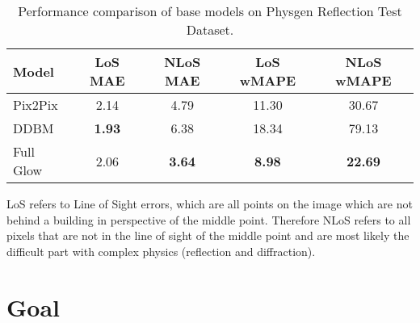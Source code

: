 		\begin{table}[h!]
			\centering
			\begin{tabular}{|l|c|c|c|c|}
				\hline
				\textbf{Model} & \textbf{LoS MAE} & \textbf{NLoS MAE} & \textbf{LoS wMAPE} & \textbf{NLoS wMAPE} \\
				\hline
				Pix2Pix & 2.14 & 4.79 & 11.30 & 30.67 \\
				DDBM & \textbf{1.93} & 6.38 & 18.34 & 79.13 \\
				Full Glow & 2.06 & \textbf{3.64} & \textbf{8.98} & \textbf{22.69} \\
				\hline
			\end{tabular}
			\caption{Performance comparison of base models on Physgen Reflection Test Dataset.}
			\label{tab:performance_base}
		\end{table}
		\FloatBarrier
		
		LoS refers to Line of Sight errors, which are all points on the image which are not behind a building in perspective of the middle point. Therefore NLoS refers to all pixels that are not in the line of sight of the middle point and are most likely the difficult part with complex physics (reflection and diffraction).
		
		
		
		
	\section{Goal}
	\label{sec:intro-goal}
		
